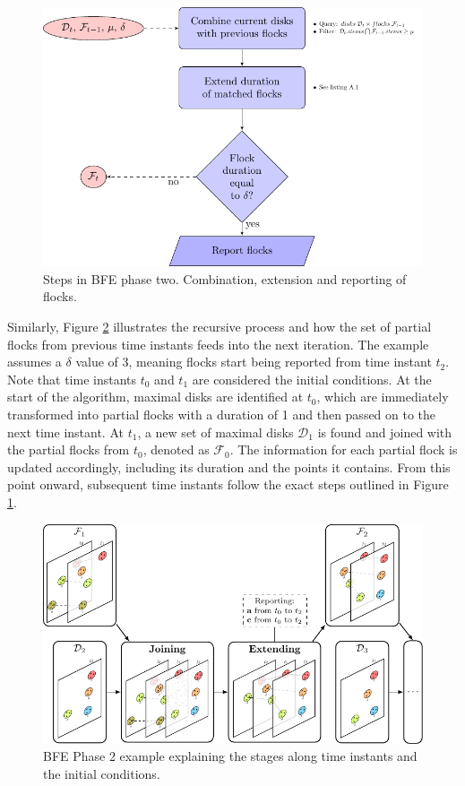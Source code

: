 \begin{figure}
    \centering
    \includegraphics[width=0.85\linewidth]{pflocks_paper/figures/FF_flowchart}
    \caption{Steps in BFE phase two. Combination, extension and reporting of flocks.}\label{fig:FF_flowchart}
\end{figure}

Similarly, Figure \ref{fig:FF_stages} illustrates the recursive process and how the set of partial flocks from previous time instants feeds into the next iteration. The example assumes a $\delta$ value of 3, meaning flocks start being reported from time instant $t_2$. Note that time instants $t_0$ and $t_1$ are considered the initial conditions. At the start of the algorithm, maximal disks are identified at $t_0$, which are immediately transformed into partial flocks with a duration of 1 and then passed on to the next time instant. At $t_1$, a new set of maximal disks $\mathcal{D}_1$ is found and joined with the partial flocks from $t_0$, denoted as $\mathcal{F}_0$. The information for each partial flock is updated accordingly, including its duration and the points it contains. From this point onward, subsequent time instants follow the exact steps outlined in Figure \ref{fig:FF_flowchart}.

\begin{figure}
    \centering
    \includegraphics[width=\linewidth]{pflocks_paper/figures/Temporal/f_stages}
    \caption{BFE Phase 2 example explaining the stages along time instants and the initial conditions.}\label{fig:FF_stages}
\end{figure}

